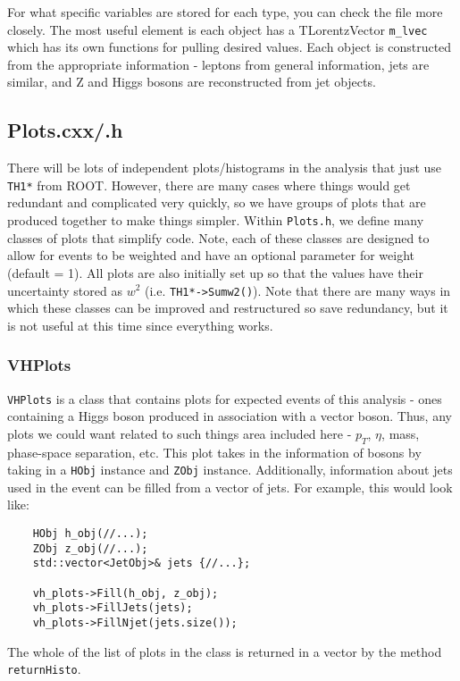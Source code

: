 \noindent For what specific variables are stored for each type, you can check the file more closely. The most useful element is each object has a TLorentzVector \verb|m_lvec| which has its own functions for pulling desired values. Each object is constructed from the appropriate information - leptons from general information, jets are similar, and Z and Higgs bosons are reconstructed from jet objects.

\subsection{Plots.cxx/.h}
There will be lots of independent plots/histograms in the analysis that just use \verb|TH1*| from ROOT. However, there are many cases where things would get redundant and complicated very quickly, so we have groups of plots that are produced together to make things simpler. Within \verb|Plots.h|, we define many classes of plots that simplify code. Note, each of these classes are designed to allow for events to be weighted and have an optional parameter for weight (default = 1). All plots are also initially set up so that the values have their uncertainty stored as $w^2$ (i.e. \verb|TH1*->Sumw2()|). Note that there are many ways in which these classes can be improved and restructured so save redundancy, but it is not useful at this time since everything works.

\subsubsection{VHPlots}
\verb|VHPlots| is a class that contains plots for expected events of this analysis - ones containing a Higgs boson produced in association with a vector boson. Thus, any plots we could want related to such things area included here - $p_T$, $\eta$, mass, phase-space separation, etc. This plot takes in the information of bosons by taking in a \verb|HObj| instance and \verb|ZObj| instance. Additionally, information about jets used in the event can be filled from a vector of jets. For example, this would look like:

\begin{verbatim}
    HObj h_obj(//...);
    ZObj z_obj(//...);
    std::vector<JetObj>& jets {//...};

    vh_plots->Fill(h_obj, z_obj);
    vh_plots->FillJets(jets);
    vh_plots->FillNjet(jets.size());
\end{verbatim}

\noindent The whole of the list of plots in the class is returned in a vector by the method \verb|returnHisto|.

